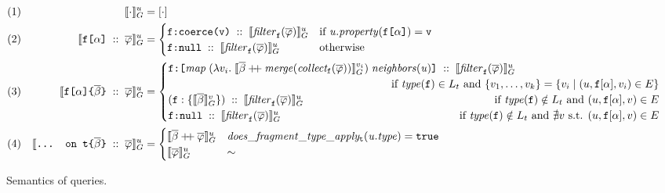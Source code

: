 \begin{figure}[t]
\small
    \centering
    \begin{align*}
    & (1) & \eval{\cdot}{u} &= [\cdot] \\
    & (2) & \evalu{\fld\; ::\; \queries} &= \begin{cases}
        \resp{\texttt{coerce(\val)}} \; ::\; \evalfilteru{\queries}{\fkey}  
        & \text{if } \mathit{u.property}(\fld) = \val \\
        \resp{\nval} \; :: \; \evalfilteru{\queries}{\fkey} 
        & \text{otherwise}
    \end{cases}\\
    & (3) & \evalu{\nfld{\overline{\beta}} \; ::\; \queries} &=
    \begin{cases}
        \resp{\texttt{[} \mathit{map}\; (\lambda v_{i}.\; \eval{\overline{\beta} \mdoubleplus \mathit{merge (collect_\fkey (\queries))}}{v_{i}})\; \mathit{neighbors(u)} \texttt{]}} \; :: \; \evalfilteru{\queries}{\fkey} \\  
        \hfill \text{ if } 
            \mathit{type(\fkey)} \in L_{t} \text{ and } \{v_{1}, \ldots, v_{k}\} = 
        \{v_{i} \mid (u, \fkey[\alpha], v_{i}) \in E\} \\
    (\fkey:\{\eval{\subqueries{\beta}}{v}\})\; :: \; \evalfilteru{\queries}{\fkey}  
        \hfill \text{ if } 
        \mathit{type(\fkey)} \notin L_{t} \text{ and } (u, \fkey[\alpha], v) \in E \\
    \resp{\nval}\; :: \; \evalfilteru{\queries}{\fkey} 
    \qquad \qquad \qquad \qquad \qquad \qquad \qquad \qquad
    \text{ if } \mathit{type(\fkey)} \notin L_{t}  \text{ and } \nexists v \text{ s.t. }  (u, \fkey[\alpha], v) \in E \\
    \end{cases}\\
    & (4) & \evalu{\ifrag{t}{\overline{\beta}}\; ::\; \queries} &= \begin{cases}
    \evalu{\overline{\beta} \mdoubleplus \queries} & \mathit{does\_fragment\_type\_apply_{\texttt{t}}(u.type)} = \texttt{true}\\
    \evalu{\queries} & \sim
    \end{cases}
    \end{align*}
    \caption{Semantics of \gql queries.
    }
    \label{fig:semantics}
\end{figure}


